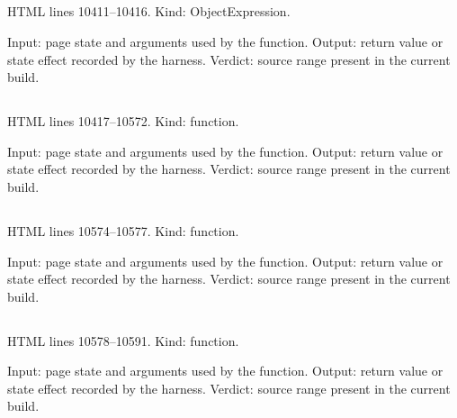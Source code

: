 \subsection*{\texttt{}}
\label{vf_569_SAMPLE_TYPE_LABEL}
HTML lines 10411--10416. Kind: ObjectExpression.

Input: page state and arguments used by the function.
Output: return value or state effect recorded by the harness.
Verdict: source range present in the current build.

\subsection*{\texttt{}}
\label{vf_570_derivedSettings}
HTML lines 10417--10572. Kind: function.

Input: page state and arguments used by the function.
Output: return value or state effect recorded by the harness.
Verdict: source range present in the current build.

\subsection*{\texttt{}}
\label{vf_571_derivedSettingsFor}
HTML lines 10574--10577. Kind: function.

Input: page state and arguments used by the function.
Output: return value or state effect recorded by the harness.
Verdict: source range present in the current build.

\subsection*{\texttt{}}
\label{vf_572_renderDerived}
HTML lines 10578--10591. Kind: function.

Input: page state and arguments used by the function.
Output: return value or state effect recorded by the harness.
Verdict: source range present in the current build.

